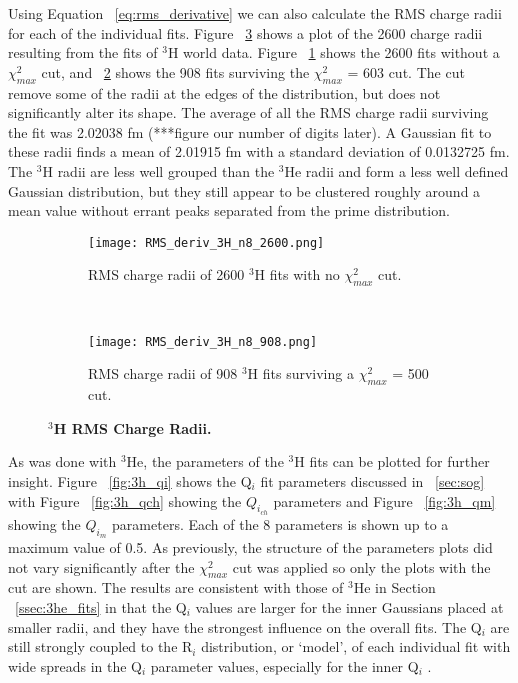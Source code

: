 Using Equation ~\ref{eq:rms_derivative} we can also calculate the RMS charge radii for each of the individual fits. Figure ~\ref{fig:3h_rms_deriv} shows a plot of the 2600 charge radii resulting from the fits of $^3$H world data. Figure ~\ref{fig:3h_rms_deriv_no_cut} shows the 2600 fits without a $\chi^2_{max}$ cut, and ~\ref{fig:3h_rms_deriv_cut} shows the 908 fits surviving the $\chi^2_{max}$ = 603 cut. The cut remove some of the radii at the edges of the distribution, but does not significantly alter its shape. The average of all the RMS charge radii surviving the fit was 2.02038 fm (***figure our number of digits later). A Gaussian fit to these radii finds a mean of 2.01915 fm with a standard deviation of 0.0132725 fm. The $^3$H radii are less well grouped than the $^3$He radii and form a less well defined Gaussian distribution, but they still appear to be clustered roughly around a mean value without errant peaks separated from the prime distribution.

\begin{figure}[!ht]
\begin{subfigure}{1.\textwidth}
  \centering
  \texttt{[image: RMS\_deriv\_3H\_n8\_2600.png]}
  \caption{RMS charge radii of 2600 $^3$H fits with no $\chi^2_{max}$ cut.}
  \label{fig:3h_rms_deriv_no_cut}
\end{subfigure}\\
\begin{subfigure}{1.\textwidth}
  \centering
  \texttt{[image: RMS\_deriv\_3H\_n8\_908.png]}
  \caption{RMS charge radii of 908 $^3$H fits surviving a $\chi^2_{max}$ = 500 cut.}
  \label{fig:3h_rms_deriv_cut}
\end{subfigure}
\caption{\bf{$^3$H RMS Charge Radii.}}
\label{fig:3h_rms_deriv}
\end{figure}

As was done with $^3$He, the parameters of the $^3$H fits can be plotted for further insight. Figure ~\ref{fig:3h_qi} shows the Q$_i$ fit parameters discussed in ~\ref{sec:sog} with Figure ~\ref{fig:3h_qch} showing the $Q_{i_{ch}}$ parameters and Figure ~\ref{fig:3h_qm} showing the $Q_{i_{m}}$ parameters. Each of the 8 parameters is shown up to a maximum value of 0.5. As previously, the structure of the parameters plots did not vary significantly after the $\chi^2_{max}$ cut was applied so only the plots with the cut are shown. The results are consistent with those of $^3$He in Section ~\ref{ssec:3he_fits} in that the Q$_i$ values are larger for the inner Gaussians placed at smaller radii, and they have the strongest influence on the overall fits. The Q$_i$ are still strongly coupled to the R$_i$ distribution, or `model', of each individual fit with wide spreads in the Q$_i$ parameter values, especially for the inner Q$_i$ .

